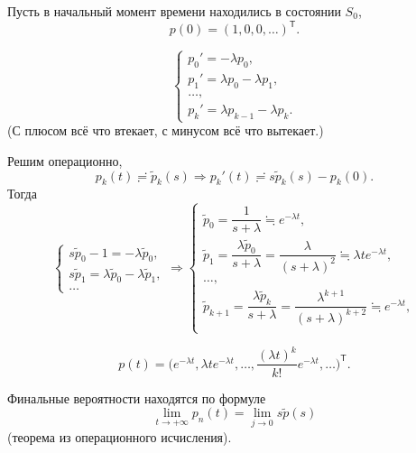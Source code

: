 \begin{ex}
  Пусть в начальный момент времени находились в состоянии $S_0$,
  \[
    p(0) = (1, 0, 0, \dots)^{\mathsf T}.
  \]
  \begin{figure}[h!]
    \centering
  \end{figure}

  \[
    \begin{cases}
      p_0' = -\lambda p_0, \\
      p_1' = \lambda p_0 - \lambda p_1, \\
      \dots, \\
      p_k' = \lambda p_{k-1} - \lambda p_k.
    \end{cases}
  \]
  (С плюсом всё что втекает, с минусом всё что вытекает.)

  Решим операционно,
  \[
    p_k(t) \risingdotseq \tilde p_k(s) 
    \Rightarrow
    p_k'(t) \risingdotseq s \tilde p_k(s) - p_k(0).
  \]
Тогда
  \[
    \begin{cases}
      s \tilde p_0 - 1 = - \lambda \tilde p_0, \\
      s \tilde p_1 = \lambda \tilde p_0 - \lambda \tilde p_1, \\
      \dots
      
    \end{cases}
    \Rightarrow
    \begin{cases}
      \tilde p_0 = \dfrac{1}{s+\lambda} \fallingdotseq e^{-\lambda t}, \\
      \tilde p_1 = \dfrac{\lambda \tilde p_0}{s+\lambda} = \dfrac{\lambda}{(s+\lambda)^2}
        \fallingdotseq \lambda t e^{-\lambda t}, \\
      \dots, \\
      \tilde p_{k+1} = \dfrac{\lambda \tilde p_k}{s+\lambda}=\dfrac{\lambda^{k+1}}{(s+\lambda)^{k+2}}
        \fallingdotseq e^{-\lambda t}, \\

    \end{cases}
  \]

  \[
    p(t) = \biggl( e^{-\lambda t}, \lambda t e^{-\lambda t}, \dots,
    \dfrac{(\lambda t)^k}{k!} e^{-\lambda t}, \dots \biggr)^{\mathsf T}.
  \]
\end{ex}

Финальные вероятности находятся по формуле
\[
  \lim_{t\to +\infty} p_n(t) = \lim_{j \to 0} s \tilde p(s)
\]
(теорема из операционного исчисления).
